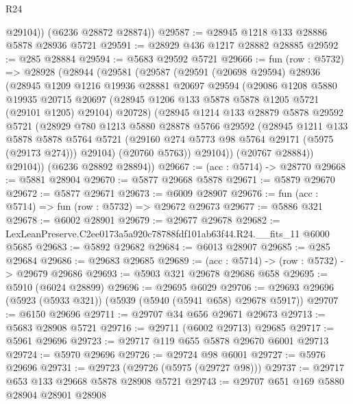 \begin{lexlean}{R24}
\begin{coremodule}
          @29104))
      (@6236 @28872 @28874))
@29587 := @28945 @1218 @133 @28886 @5878 @28936 @5721
@29591 := @28929 @436 @1217 @28882 @28885
@29592 := @285 @28884
@29594 := @5683 @29592 @5721
@29666 := fun (row : @5732) =>
  @28928
    (@28944
      (@29581
        (@29587
          (@29591
            (@20698 @29594)
            @28936
            (@28945
              @1209
              @1216
              @19936
              @28881
              @20697
              @29594
              (@29086
                @1208
                @5880
                @19935
                @20715
                @20697
                (@28945 @1206 @133 @5878 @5878 @1205 @5721 (@29101 @1205) @29104)
                @20728)
              (@28945
                @1214
                @133
                @28879
                @5878
                @29592
                @5721
                (@28929
                  @780
                  @1213
                  @5880
                  @28878
                  @5766
                  @29592
                  (@28945
                    @1211
                    @133
                    @5878
                    @5878
                    @5764
                    @5721
                    (@29160 @274 @5773 @98 @5764 @29171 (@5975 (@29173 @274)))
                    @29104)
                  (@20760 @5763))
                @29104))
            (@20767 @28884))
          @29104))
      (@6236 @28892 @28894))
@29667 := (acc : @5714) -> @28770
@29668 := @5881 @28904
@29670 := @5877 @29668 @5878
@29671 := @5879 @29670
@29672 := @5877 @29671
@29673 := @6009 @28907
@29676 := fun (acc : @5714) => fun (row : @5732) => @29672 @29673
@29677 := @5886 @321
@29678 := @6002 @28901
@29679 := @29677 @29678
@29682 := LexLeanPreserve.C2ee0173a5a920c78788fdf101ab63f44.R24.__fits_11 @6000 @5685
@29683 := @5892 @29682
@29684 := @6013 @28907
@29685 := @285 @29684
@29686 := @29683 @29685
@29689 := (acc : @5714) -> (row : @5732) -> @29679 @29686
@29693 := @5903 @321 @29678 @29686 @658
@29695 := @5910 (@6024 @28899)
@29696 := @29695 @6029
@29706 := @29693 @29696 (@5923 (@5933 @321)) (@5939 (@5940 (@5941 @658) @29678 @5917))
@29707 := @6150 @29696
@29711 := @29707 @34 @656 @29671 @29673
@29713 := @5683 @28908 @5721
@29716 := @29711 (@6002 @29713) @29685
@29717 := @5961 @29696
@29723 := @29717 @119 @655 @5878 @29670 @6001 @29713
@29724 := @5970 @29696
@29726 := @29724 @98 @6001
@29727 := @5976 @29696
@29731 := @29723 (@29726 (@5975 (@29727 @98)))
@29737 := @29717 @653 @133 @29668 @5878 @28908 @5721
@29743 := @29707 @651 @169 @5880 @28904 @28901 @28908

\end{coremodule}
\end{lexlean}
